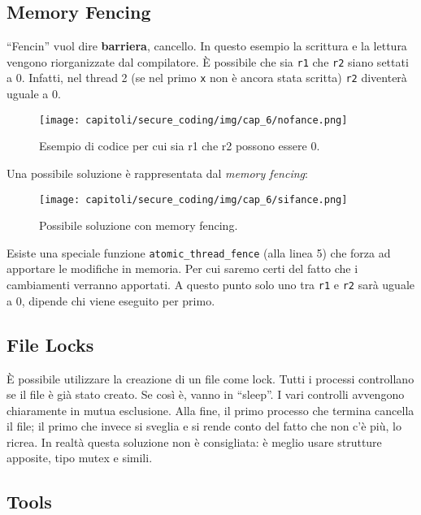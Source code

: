 \subsection{Memory Fencing}

``Fencin'' vuol dire \textbf{barriera}, cancello.
In questo esempio la scrittura e la lettura vengono riorganizzate dal compilatore.
È possibile che sia \verb|r1| che \verb|r2| siano settati a 0.
Infatti, nel thread 2 (se nel primo \verb|x| non è ancora stata scritta) \verb|r2|
diventerà uguale a 0.

\begin{figure}[H]
    \centering
    \texttt{[image: capitoli/secure\_coding/img/cap\_6/nofance.png]}
    \caption{Esempio di codice per cui sia r1 che r2 possono essere 0.}
\end{figure}

Una possibile soluzione è rappresentata dal \textit{memory fencing}:

\begin{figure}[H]
    \centering
    \texttt{[image: capitoli/secure\_coding/img/cap\_6/sifance.png]}
    \caption{Possibile soluzione con memory fencing.}
\end{figure}

Esiste una speciale funzione \verb|atomic_thread_fence| (alla linea 5) che forza ad apportare le modifiche in memoria.
Per cui saremo certi del fatto che i cambiamenti verranno apportati.
A questo punto solo uno tra \verb|r1| e \verb|r2| sarà uguale a 0, dipende chi viene eseguito per primo.


\subsection{File Locks}

È possibile utilizzare la creazione di un file come lock.
Tutti i processi controllano se il file è già stato creato.
Se così è, vanno in ``sleep''. I vari controlli avvengono chiaramente in mutua esclusione.
Alla fine, il primo processo che termina cancella il file; il primo che invece si sveglia e si rende conto del fatto che non c'è più, lo ricrea.
In realtà questa soluzione non è consigliata: è meglio usare strutture apposite, tipo mutex e simili.

\subsection{Tools}

